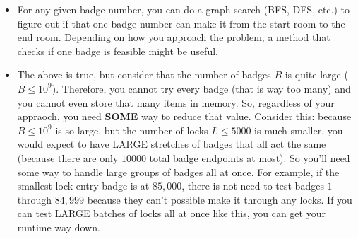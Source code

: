 \documentclass[11pt]{article}
\begin{document}
\begin{itemize}
	\item For any given badge number, you can do a graph search (BFS, DFS, etc.) to figure out if that one badge number can make it from the start room to the end room. Depending on how you approach the problem, a method that checks if one badge is feasible might be useful.
	\item The above is true, but consider that the number of badges $B$ is quite large ($B \leq 10^9$). Therefore, you cannot try every badge (that is way too many) and you cannot even store that many items in memory. So, regardless of your appraoch, you need \textbf{SOME} way to reduce that value. Consider this: because $B \leq 10^9$ is so large, but the number of locks $L \leq 5000$ is much smaller, you would expect to have LARGE stretches of badges that all act the same (because there are only $10000$ total badge endpoints at most). So you'll need some way to handle large groups of badges all at once. For example, if the smallest lock entry badge is at $85,000$, there is not need to test badges $1$ through $84,999$ because they can't possible make it through any locks. If you can test LARGE batches of locks all at once like this, you can get your runtime way down.  
\end{itemize}
\end{document}
